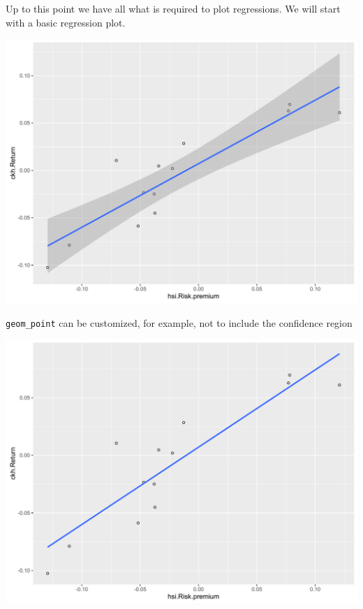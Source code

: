 Up to this point we have all what is required to plot regressions. We
will start with a basic regression plot.

\begin{Shaded}
\begin{Highlighting}[]
\StringTok{ }\NormalTok{(}
\StringTok{      }\StringTok{ }\NormalTok{(}\NormalTok{) +}\StringTok{ }\NormalTok{(}
\end{Highlighting}
\end{Shaded}

\begin{center}\includegraphics[width=0.55\linewidth]{figures/lr_6-1} \end{center}

\texttt{geom\_point} can be customized, for example, not to include the
confidence region

\begin{Shaded}
\begin{Highlighting}[]
\StringTok{ }\NormalTok{(}
\StringTok{       }\NormalTok{(}\NormalTok{) +}\StringTok{ }\NormalTok{(}\NormalTok{) }
\end{Highlighting}
\end{Shaded}

\begin{center}\includegraphics[width=0.55\linewidth]{figures/lr_7-1} \end{center}

